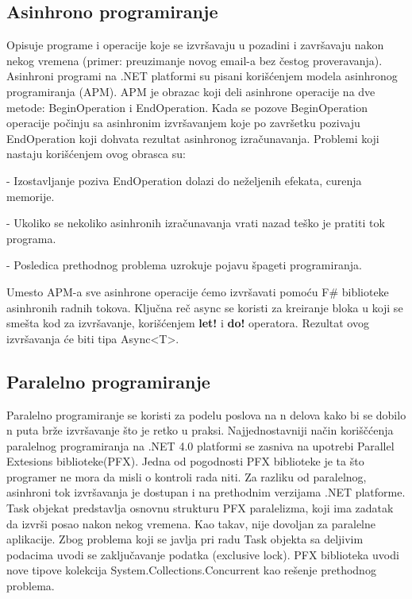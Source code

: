 \documentclass[a4paper]{article}
\begin{document}
\subsection{Asinhrono programiranje} 
Opisuje programe i operacije koje se izvršavaju u pozadini i završavaju nakon nekog vremena (primer: preuzimanje novog email-a bez čestog proveravanja). Asinhroni programi na .NET platformi su pisani korišćenjem modela asinhronog programiranja (APM). APM je obrazac koji deli asinhrone operacije na dve metode: BeginOperation i EndOperation. Kada se pozove BeginOperation operacije počinju sa asinhronim izvršavanjem koje po završetku pozivaju EndOperation koji dohvata rezultat asinhronog izračunavanja. Problemi koji nastaju korišćenjem ovog obrasca su: 

	- Izostavljanje poziva EndOperation dolazi do neželjenih efekata, curenja memorije.
 
	- Ukoliko se nekoliko asinhronih izračunavanja vrati nazad teško je pratiti tok programa.
	
	- Posledica prethodnog problema uzrokuje pojavu špageti programiranja.

Umesto APM-a sve asinhrone operacije ćemo izvršavati pomoću F\# biblioteke asinhronih radnih tokova\cite{workFlow}. Ključna reč async se koristi za kreiranje bloka u koji se smešta kod za izvršavanje, korišćenjem \textbf{let!} i \textbf{do!} operatora. Rezultat ovog izvršavanja će biti tipa Async<T>\cite{theAL}.

\subsection{Paralelno programiranje}
Paralelno programiranje se koristi za podelu poslova na n delova kako bi se dobilo n puta brže izvršavanje što je retko u praksi. Najjednostavniji način koriščćenja paralelnog programiranja na .NET 4.0 platformi se zasniva na upotrebi Parallel Extesions biblioteke(PFX). Jedna od pogodnosti PFX biblioteke je ta što programer ne mora da misli o kontroli rada niti. Za razliku od paralelnog, asinhroni tok izvršavanja je dostupan i na prethodnim verzijama .NET platforme. Task objekat predstavlja osnovnu strukturu PFX paralelizma, koji ima zadatak da izvrši posao nakon nekog vremena. Kao takav, nije dovoljan za paralelne aplikacije. Zbog problema koji se javlja pri radu Task objekta sa deljivim podacima uvodi se zaključavanje podatka (exclusive lock). PFX biblioteka uvodi nove tipove kolekcija System.Collections.Concurrent \cite{sysCC} kao rešenje prethodnog problema.  
\end{document}
